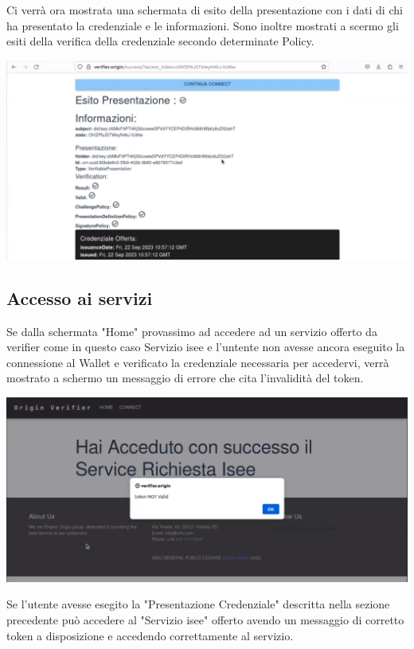 Ci verrà ora mostrata una schermata di esito della presentazione con i dati di chi ha presentato la credenziale e le informazioni. Sono inoltre mostrati a scermo gli esiti della verifica della credenziale secondo determinate Policy. \\
\begin{center}
    \includegraphics[scale = 0.2]{./res/img/verifier/esito.png}
\end{center}

\subsection{Accesso ai servizi}
Se dalla schermata "Home" provassimo ad accedere ad un servizio offerto da verifier come in questo caso Servizio isee e l'untente non avesse ancora eseguito la connessione al Wallet e verificato la credenziale necessaria per accedervi, verrà mostrato a schermo un messaggio di errore che cita l'invalidità del token.

\begin{center}
    \includegraphics[scale = 0.2]{./res/img/verifier/tokenNONvalido.png}
\end{center}

Se l'utente avesse esegito la  "Presentazione Credenziale" descritta nella sezione precedente può accedere al "Servizio isee" offerto avendo un messaggio di corretto token a disposizione e accedendo correttamente al servizio.\\

